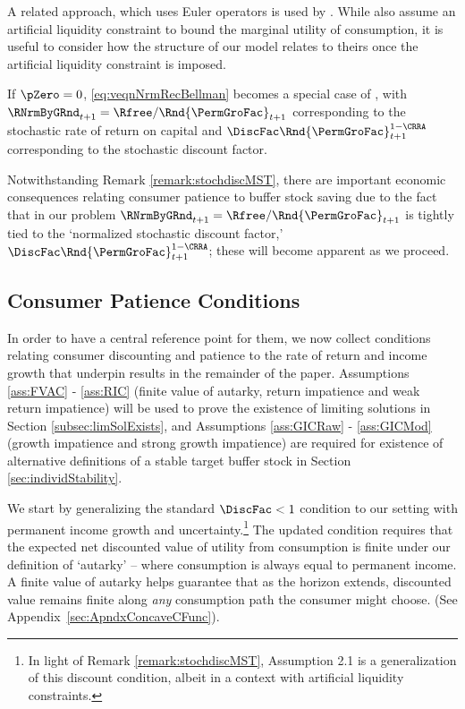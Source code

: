 \documentclass[BufferStockTheory]{subfiles}
\begin{document}
A related approach, which uses Euler operators is used by \cite{mstIncFluct}. While \cite{mstIncFluct} also assume an artificial liquidity constraint to bound the marginal utility of consumption, it is useful to consider how the structure of our model relates to theirs  once the artificial liquidity constraint is imposed. 

\begin{remark}\label{remark:stochdiscMST}
If $\pZero=0$, \eqref{eq:veqnNrmRecBellman} becomes a special case of \cite{mstIncFluct}, with $\RNrmByGRnd_{t+1}=\Rfree/\Rnd{\PermGroFac}_{t+1}$ corresponding to the stochastic rate of return on capital and $\DiscFac \Rnd{\PermGroFac}_{t+1}^{1-\CRRA}$  corresponding to the stochastic discount factor.
\end{remark}

Notwithstanding Remark \ref{remark:stochdiscMST},  there are important economic consequences relating consumer patience to buffer stock saving due to the fact that in our problem $\RNrmByGRnd_{t+1}=\Rfree/\Rnd{\PermGroFac}_{t+1}$ is tightly tied to the `normalized stochastic discount factor,' $\DiscFac \Rnd{\PermGroFac}_{t+1}^{1-\CRRA}$; these will become apparent as we proceed. 

\hypertarget{GICTheorySetup}{}
\subsection{Consumer Patience Conditions}\label{subsec:GICTheorySetup}

In order to have a central reference point for them, we now collect conditions relating consumer discounting and patience to the rate of return and income growth that underpin results in the remainder of the paper.
Assumptions \ref{ass:FVAC} - \ref{ass:RIC}  (finite value of autarky, return impatience and weak return impatience) will be used to prove the existence of limiting solutions in Section \ref{subsec:limSolExists}, and Assumptions \ref{ass:GICRaw} - \ref{ass:GICMod} (growth impatience and strong growth impatience) are required for existence of alternative definitions of a stable target buffer stock in Section \ref{sec:individStability}.


We start by generalizing the standard $\DiscFac<1$ condition to our setting with permanent income growth and uncertainty.\footnote{In light of Remark \ref{remark:stochdiscMST}, \cite{mstIncFluct} Assumption 2.1 is a generalization of this discount condition, albeit in a context with artificial liquidity constraints.} The updated condition requires that the expected net discounted value of utility from consumption is finite under our definition of `autarky' -- where consumption is always equal to permanent income.
A finite value of autarky helps guarantee that as the horizon extends, discounted value remains finite along \textit{any} consumption path the consumer might choose.
(See Appendix~\ref{sec:ApndxConcaveCFunc}).
\end{document}
